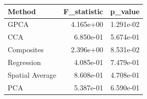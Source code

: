 \begin{tabular}{lrr}
\toprule
Method & F_statistic & p_value \\
\midrule
GPCA & 4.165e+00 & 1.291e-02 \\
CCA & 6.850e-01 & 5.674e-01 \\
Composites & 2.396e+00 & 8.531e-02 \\
Regression & 4.085e-01 & 7.479e-01 \\
Spatial Average & 8.608e-01 & 4.708e-01 \\
PCA & 5.387e-01 & 6.590e-01 \\
\bottomrule
\end{tabular}
